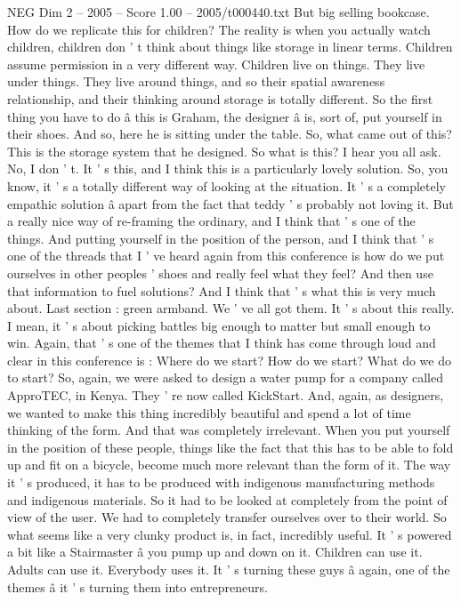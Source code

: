\begin{textsample}{NEG Dim 2 – 2005 – Score 1.00 – 2005/t000440.txt}
But big selling bookcase.
How do we replicate this for children?
The reality is when you actually watch children, children don ' t think about things like storage in linear terms.
Children assume permission in a very different way.
Children live on things.
They live under things.
They live around things, and so their spatial awareness relationship, and their thinking around storage is totally different.
So the first thing you have to do â this is Graham, the designer â is, sort of, put yourself in their shoes.
And so, here he is sitting under the table.
So, what came out of this?
This is the storage system that he designed.
So what is this?
I hear you all ask.
No, I don ' t.
It ' s this, and I think this is a particularly lovely solution.
So, you know, it ' s a totally different way of looking at the situation.
It ' s a completely empathic solution â apart from the fact that teddy ' s probably not loving it.
But a really nice way of re-framing the ordinary, and I think that ' s one of the things.
And putting yourself in the position of the person, and I think that ' s one of the threads that I ' ve heard again from this conference is how do we put ourselves in other peoples ' shoes and really feel what they feel?
And then use that information to fuel solutions?
And I think that ' s what this is very much about.
Last section : green armband.
We ' ve all got them.
It ' s about this really.
I mean, it ' s about picking battles big enough to matter but small enough to win.
Again, that ' s one of the themes that I think has come through loud and clear in this conference is : Where do we start?
How do we start?
What do we do to start?
So, again, we were asked to design a water pump for a company called ApproTEC, in Kenya.
They ' re now called KickStart.
And, again, as designers, we wanted to make this thing incredibly beautiful and spend a lot of time thinking of the form.
And that was completely irrelevant.
When you put yourself in the position of these people, things like the fact that this has to be able to fold up and fit on a bicycle, become much more relevant than the form of it.
The way it ' s produced, it has to be produced with indigenous manufacturing methods and indigenous materials.
So it had to be looked at completely from the point of view of the user.
We had to completely transfer ourselves over to their world.
So what seems like a very clunky product is, in fact, incredibly useful.
It ' s powered a bit like a Stairmaster â you pump up and down on it.
Children can use it.
Adults can use it.
Everybody uses it.
It ' s turning these guys â again, one of the themes â it ' s turning them into entrepreneurs.

\end{textsample}
